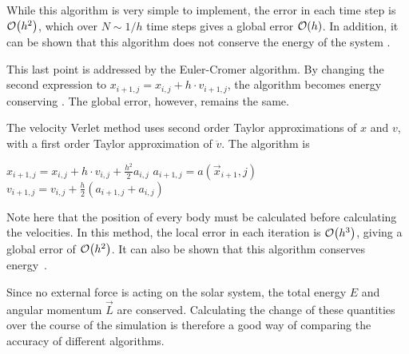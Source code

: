 \documentclass[a4paper,10pt,twocolumn]{article}
\begin{document}
While this algorithm is very simple to implement, the error in each time step is $\order{h^2}$, which over $N\sim 1/h$ time steps gives a global error $\order{h}$. In addition, it can be shown that this algorithm does not conserve the energy of the system \cite{lecture}. 

This last point is addressed by the Euler-Cromer algorithm. By changing the second expression to $x_{i+1,j} = x_{i,j} + h\cdot v_{i+1,j}$, the algorithm becomes energy conserving \cite{lecture}. The global error, however, remains the same. 

The velocity Verlet method uses second order Taylor approximations of $x$ and $v$, with a first order Taylor approximation   of $\ddot{v}$. The algorithm is \cite{lecture}
\begin{algorithmic}
\State $x_{i+1,j} = x_{i,j} + h\cdot v_{i,j} + \frac{h^2}{2} a_{i,j}$
\EndFor
{}
\State $a_{i+1,j} = a(\vec{x}_{i+1},j)$
\EndFor
{}
\State $v_{i+1,j} = v_{i,j} + \frac{h}{2}(a_{i+1,j} + a_{i,j})$
\EndFor
\EndFor
\end{algorithmic}
Note here that the position of every body must be calculated before calculating the velocities. In this method, the local error in each iteration is $\order{h^3}$, giving a global error of $\order{h^2}$. It can also be shown that this algorithm conserves energy \cite{lecture}.


Since no external force is acting on the solar system, the total energy $E$ and angular momentum $\vec{L}$ are conserved. Calculating the change of these quantities over the course of the simulation is therefore a good way of comparing the accuracy of different algorithms.

\end{document}
